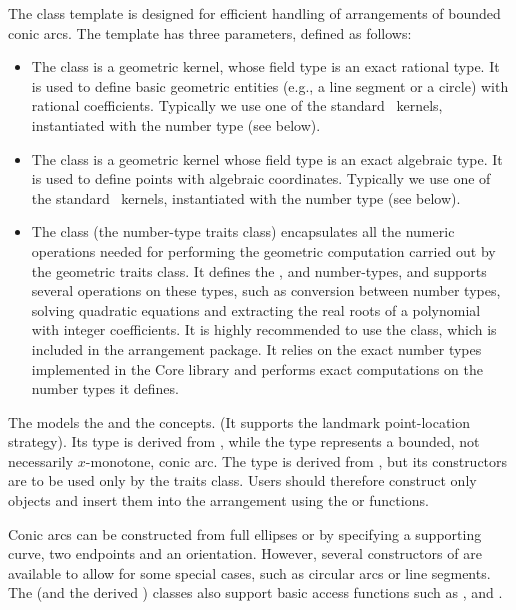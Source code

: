 The  class
template is designed for efficient handling of arrangements of
bounded conic arcs. The template has three parameters, defined as
follows:
\begin{itemize}
\item The  class is a geometric kernel, whose field
type is an exact rational type. It is used to define basic
geometric entities (e.g., a line segment or a circle) with rational
coefficients. Typically we use one of the standard \cgal\ kernels,
instantiated with the number type  (see
below).
%
\item The  class is a geometric kernel whose field
type is an exact algebraic type. It is used to define points with
algebraic coordinates. Typically we use one of the standard
\cgal\ kernels, instantiated with the number type
 (see below).
%
\item The  class (the number-type traits class)
encapsulates all the numeric operations needed for performing the
geometric computation carried out by the geometric traits class.
It defines the ,  and 
number-types, and supports several operations on these types, such
as conversion between number types, solving quadratic equations
and extracting the real roots of a polynomial with integer
coefficients. It is highly recommended to use the
 class, which is included in the
arrangement package. It relies on the exact number types
implemented in the {\sc Core} library and performs exact
computations on the number types it defines.
\end{itemize}

The  models the  and
the  concepts. (It supports
the landmark point-location strategy). Its  type is
derived from , while the 
type represents a bounded, not necessarily $x$-monotone, conic arc.
The  type is derived from ,
but its constructors are to be used only by the traits class.
Users should therefore construct only  objects and
insert them into the arrangement using the 
or  functions.

Conic arcs can be constructed from full ellipses or by specifying
a supporting curve, two endpoints and an orientation. However,
several constructors of  are available to allow for some
special cases, such as circular arcs or line segments. The
 (and the derived ) classes
also support basic access functions such as ,
 and .

